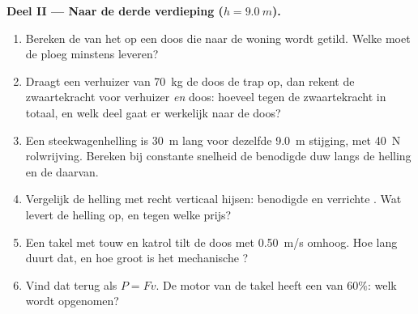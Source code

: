 \begin{problem}
\medskip
\noindent\textbf{Deel II --- Naar de derde verdieping
($h = \qty{9.0}{m}$).}
\begin{enumerate}[resume]
  \item Bereken de  van het  op een doos die naar de woning
        wordt getild. Welke  moet de ploeg minstens leveren?
  \item Draagt een verhuizer van \qty{70}{kg} de doos de trap op, dan
        rekent de zwaartekracht voor verhuizer \emph{en} doos: hoeveel
         tegen de zwaartekracht in totaal, en welk deel gaat er
        werkelijk naar de doos?
  \item Een steekwagenhelling is \qty{30}{m} lang voor dezelfde
        \qty{9.0}{m} stijging, met \qty{40}{N} rolwrijving. Bereken bij
        constante snelheid de benodigde duw langs de helling en de 
        daarvan.
  \item Vergelijk de helling met recht verticaal hijsen: benodigde 
        en verrichte . Wat levert de helling op, en tegen welke
        prijs?
  \item Een takel met touw en katrol tilt de doos met \qty{0.50}{m/s}
        omhoog. Hoe lang duurt dat, en hoe groot is het mechanische
        ?
  \item Vind dat  terug als $P = Fv$. De motor van de takel heeft
        een  van $60\%$: welk  wordt
        opgenomen?
\end{enumerate}


\end{problem}
